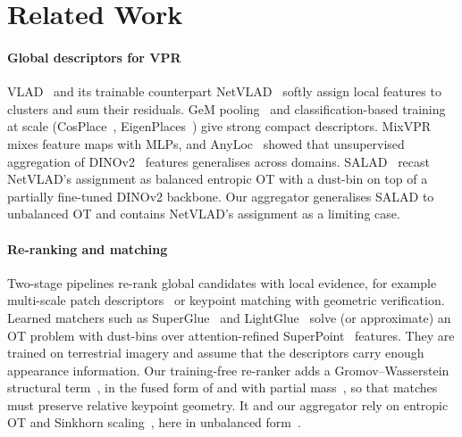 \section{Related Work}\label{sec:related}
\paragraph*{Global descriptors for VPR}
VLAD~\cite{jegou2010vlad} and its trainable counterpart NetVLAD~\cite{arandjelovic2016netvlad}
softly assign local features to clusters and sum their residuals. GeM pooling~\cite{radenovic2019gem}
and classification-based training at scale (CosPlace~\cite{berton2022cosplace},
EigenPlaces~\cite{berton2023eigenplaces}) give strong compact descriptors. MixVPR~\cite{alibey2023mixvpr}
mixes feature maps with MLPs, and AnyLoc~\cite{keetha2024anyloc} showed that unsupervised aggregation
of DINOv2~\cite{oquab2024dinov2} features generalises across domains. SALAD~\cite{izquierdo2024optimal} recast NetVLAD's assignment as balanced entropic OT
with a dust-bin on top of a partially fine-tuned DINOv2 backbone. Our aggregator generalises SALAD
to unbalanced OT and contains NetVLAD's assignment as a limiting case.

\paragraph*{Re-ranking and matching}
Two-stage pipelines re-rank global candidates with local evidence, for example multi-scale patch
descriptors~\cite{hausler2021patch} or keypoint matching with geometric verification. Learned
matchers such as SuperGlue~\cite{sarlin2020superglue} and LightGlue~\cite{lindenberger2023lightglue}
solve (or approximate) an OT problem with dust-bins over attention-refined
SuperPoint~\cite{detone2018superpoint} features. They are trained on terrestrial imagery and assume
that the descriptors carry enough appearance information. Our training-free re-ranker adds a
Gromov--Wasserstein structural term~\cite{memoli2011gromov,peyre2016gromov}, in the fused form of
\cite{vayer2019fgw} and with partial mass~\cite{chapel2020partial}, so that matches must preserve
relative keypoint geometry. It and our aggregator rely on entropic OT and Sinkhorn
scaling~\cite{cuturi2013sinkhorn,peyre2019computational}, here in unbalanced form~\cite{chizat2018scaling}.

